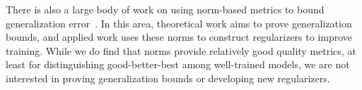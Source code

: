 There is also a large body of work on using norm-based metrics to bound generalization error~\cite{NTS15, BFT17_TR, LMBx18_TR}.
In this area, theoretical work aims to prove generalization bounds, and applied work uses these norms to construct regularizers to improve training.
While we do find that norms provide relatively good quality metrics, at least for distinguishing good-better-best among well-trained models, we are not interested in proving generalization bounds or developing new regularizers.


